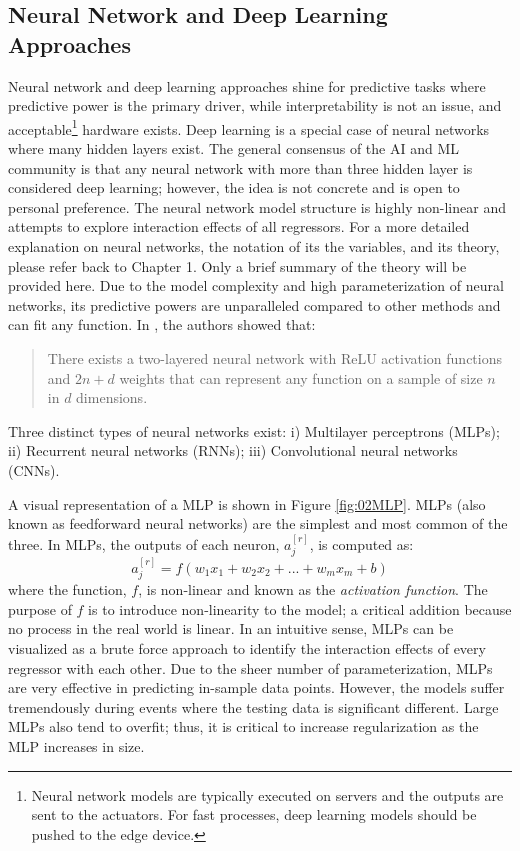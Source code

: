\subsection{Neural Network and Deep Learning Approaches}
Neural network and deep learning approaches shine for predictive tasks where predictive power is the primary driver, while interpretability is not an issue, and acceptable\footnote{Neural network models are typically executed on servers and the outputs are sent to the actuators.  For fast processes, deep learning models should be pushed to the edge device.} hardware exists.  Deep learning is a special case of neural networks where many hidden layers exist.  The general consensus of the AI and ML community is that any neural network with more than three hidden layer is considered deep learning; however, the idea is not concrete and is open to personal preference.  The neural network model structure is highly non-linear and attempts to explore interaction effects of all regressors.  For a more detailed explanation on neural networks, the notation of its the variables, and its theory, please refer back to Chapter 1. Only a brief summary of the theory will be provided here. Due to the model complexity and high parameterization of neural networks, its predictive powers are unparalleled compared to other methods and can fit any function. In \cite{nn_fit}, the authors showed that:
\begin{framed}
\begin{quote}
There exists a two-layered neural network with ReLU activation functions and $2n+d$ weights that can represent any function on a sample of size $n$ in $d$ dimensions. 
\end{quote}
\end{framed}
Three distinct types of neural networks exist: i) Multilayer perceptrons (MLPs); ii) Recurrent neural networks (RNNs); iii) Convolutional neural networks (CNNs).

A visual representation of a MLP is shown in Figure \ref{fig:02MLP}.  MLPs (also known as feedforward neural networks) are the simplest and most common of the three.  In MLPs, the outputs of each neuron, $a_j^{[r]}$, is computed as:
\begin{equation}
    a_j^{[r]} = f(w_1x_1 + w_2x_2 + ... + w_mx_m + b)
\end{equation}
where the function, $f$, is non-linear and known as the \textit{activation function}.  The purpose of $f$ is to introduce non-linearity to the model; a critical addition because no process in the real world is linear.  In an intuitive sense, MLPs can be visualized as a brute force approach to identify the interaction effects of every regressor with each other. Due to the sheer number of parameterization, MLPs are very effective in predicting in-sample data points.  However, the models suffer tremendously during events where the testing data is significant different. Large MLPs also tend to overfit; thus, it is critical to increase regularization as the MLP increases in size.

